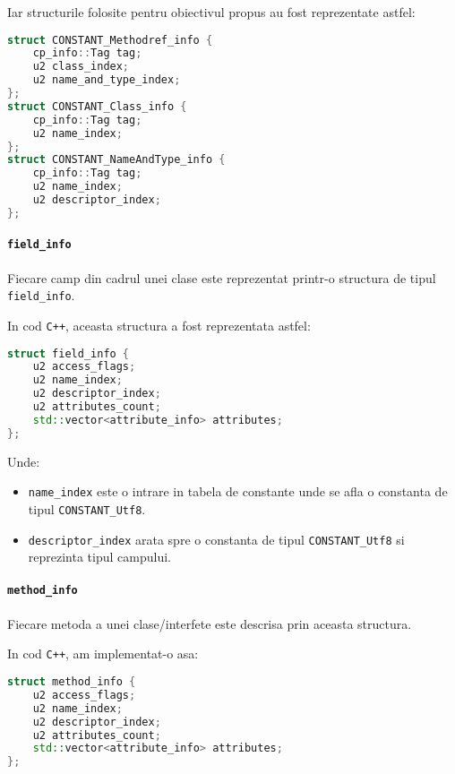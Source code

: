 Iar structurile folosite pentru obiectivul propus au fost reprezentate
astfel:

\begin{lstlisting}[language=C++]
struct CONSTANT_Methodref_info {
    cp_info::Tag tag;
    u2 class_index;
    u2 name_and_type_index;
};
struct CONSTANT_Class_info {
    cp_info::Tag tag;
    u2 name_index;
};
struct CONSTANT_NameAndType_info {
    cp_info::Tag tag;
    u2 name_index;
    u2 descriptor_index;
};
\end{lstlisting}

\paragraph{\texorpdfstring{\texttt{field\_info}}{field\_info}}\label{field_info}

Fiecare camp din cadrul unei clase este reprezentat printr-o structura
de tipul \texttt{field\_info}.

In cod \texttt{C++}, aceasta structura a fost reprezentata astfel:

\begin{lstlisting}[language=C++]
struct field_info {
    u2 access_flags;
    u2 name_index;
    u2 descriptor_index;
    u2 attributes_count;
    std::vector<attribute_info> attributes;
};
\end{lstlisting}

Unde:
\begin{itemize}
	\item \texttt{name\_index} este o intrare in tabela de constante unde se afla o constanta de tipul \texttt{CONSTANT\_Utf8}.
	\item \texttt{descriptor\_index} arata spre o constanta de tipul \texttt{CONSTANT\_Utf8} si reprezinta tipul campului.
\end{itemize}

\paragraph{\texorpdfstring{\texttt{method\_info}}{method\_info}}\label{method_info}

Fiecare metoda a unei clase/interfete este descrisa prin aceasta
structura.

In cod \texttt{C++}, am implementat-o asa:

\begin{lstlisting}[language=C++]
struct method_info {
    u2 access_flags;
    u2 name_index;
    u2 descriptor_index;
    u2 attributes_count;
    std::vector<attribute_info> attributes;
};
\end{lstlisting}

